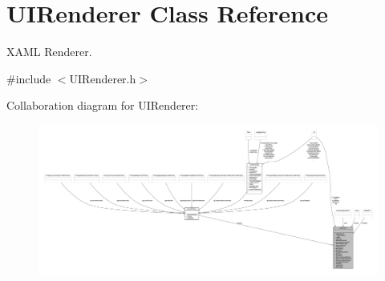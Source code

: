 \hypertarget{class_u_i_renderer}{\section{U\-I\-Renderer Class Reference}
\label{class_u_i_renderer}
}


X\-A\-M\-L Renderer.  




{\ttfamily \#include $<$U\-I\-Renderer.\-h$>$}



Collaboration diagram for U\-I\-Renderer\-:\nopagebreak
\begin{figure}[H]
\begin{center}
\leavevmode
\includegraphics[width=350pt]{class_u_i_renderer__coll__graph}
\end{center}
\end{figure}
